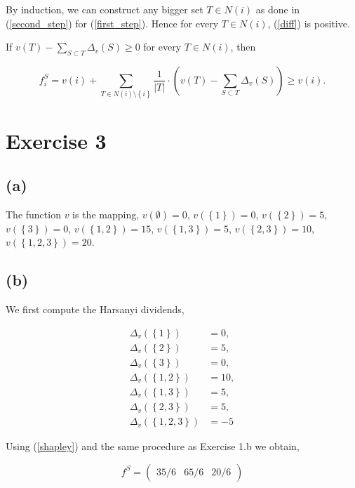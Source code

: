 \documentclass[american]{scrartcl}
\newcommand{\set}[1]{\left\{#1\right\}}
\newcommand{\abs}[1]{\left\lvert #1 \right\rvert}
\begin{document}
By induction, we can construct any bigger set $T \in N(i)$ as done in (\ref{second_step}) for (\ref{first_step}). Hence for every $T \in N(i)$, (\ref{diff}) is positive.

If $v(T) -\sum_{S \subset T} \Delta_v(S) \geq 0$ for every $T \in N(i)$, then

\begin{equation}
    f^S_i = v(i) + \sum_{T \in N(i) \setminus \set{i} } \frac{1}{\abs{T}} \cdot \left( v(T) - \sum_{S \subset T} \Delta_v(S) \right) \geq v(i).
\end{equation}

\section*{Exercise 3}

\subsection*{(a)}

The function $v$ is the mapping, $v(\emptyset) = 0$,
$v(\set{1}) = 0$,
$v(\set{2}) = 5$,
$v(\set{3}) = 0$,
$v(\set{1, 2}) = 15$,
$v(\set{1, 3}) = 5$,
$v(\set{2, 3}) = 10$,
$v(\set{1, 2, 3}) = 20$.

\subsection*{(b)}

We first compute the Harsanyi dividends,

\begin{equation}
    \begin{split}
        \Delta_v(\set{1}) &= 0, \\
        \Delta_v(\set{2}) &= 5, \\
        \Delta_v(\set{3}) &= 0, \\
        \Delta_v(\set{1, 2}) &= 10, \\
        \Delta_v(\set{1, 3}) &= 5, \\
        \Delta_v(\set{2, 3}) &= 5, \\
        \Delta_v(\set{1, 2, 3}) &= -5
    \end{split}
\end{equation}

Using (\ref{shapley}) and the same procedure as Exercise 1.b we obtain,

\begin{equation}
    f^S = \begin{pmatrix}
        35/6 & 65/6 & 20/6
    \end{pmatrix}
\end{equation}
\end{document}
